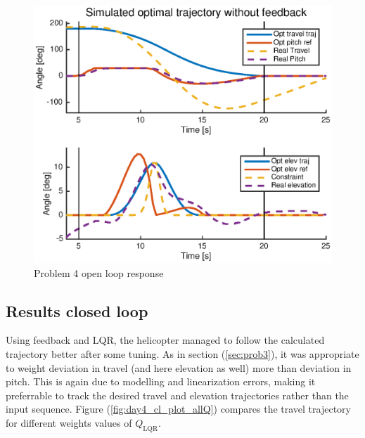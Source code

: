 
\begin{figure}[htb]
    \centering
     \includegraphics{figures/day4_ol/plot_day4_OL}
    \caption{Problem 4 open loop response}
    \label{fig:day4_ol}
\end{figure}

\subsection{Results closed loop}

Using feedback and LQR, the helicopter managed to follow the calculated trajectory better after some tuning. As in section (\ref{sec:prob3}), it was appropriate to weight deviation in travel (and here elevation as well) more than deviation in pitch. This is again due to modelling and linearization errors, making it preferrable to track the desired travel and elevation trajectories rather than the input sequence. Figure (\ref{fig:day4_cl_plot_allQ}) compares the travel trajectory for different weights values of $Q_{\text{LQR}}$.

